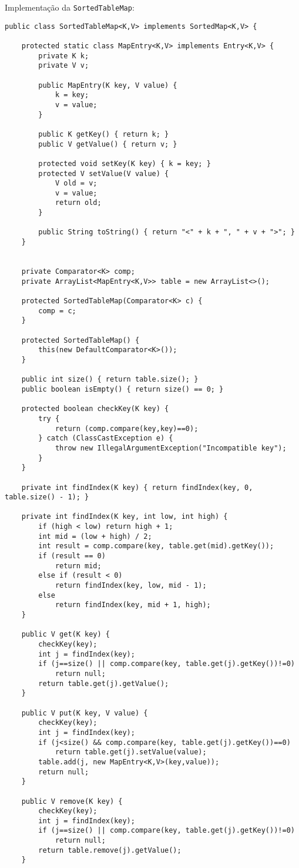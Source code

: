 Implementação da \texttt{SortedTableMap}:
\begin{verbatim}
public class SortedTableMap<K,V> implements SortedMap<K,V> {
	
	protected static class MapEntry<K,V> implements Entry<K,V> {
		private K k;
		private V v;
		
		public MapEntry(K key, V value) {
			k = key;
			v = value;
		}
		
		public K getKey() { return k; }
		public V getValue() { return v; }
		
		protected void setKey(K key) { k = key; }
		protected V setValue(V value) {
			V old = v;
			v = value;
			return old;
		}
		
		public String toString() { return "<" + k + ", " + v + ">"; }
	}
	
	
	private Comparator<K> comp;
	private ArrayList<MapEntry<K,V>> table = new ArrayList<>();
	
	protected SortedTableMap(Comparator<K> c) {
		comp = c;
	}
	
	protected SortedTableMap() {
		this(new DefaultComparator<K>());
	}
	
	public int size() { return table.size(); }
	public boolean isEmpty() { return size() == 0; }
	
	protected boolean checkKey(K key) {
		try {
			return (comp.compare(key,key)==0);
		} catch (ClassCastException e) {
			throw new IllegalArgumentException("Incompatible key");
		}
	}
	
	private int findIndex(K key) { return findIndex(key, 0, table.size() - 1); }
	
	private int findIndex(K key, int low, int high) {
		if (high < low) return high + 1;
		int mid = (low + high) / 2;
		int result = comp.compare(key, table.get(mid).getKey());
		if (result == 0)
			return mid;
		else if (result < 0)
			return findIndex(key, low, mid - 1);
		else
			return findIndex(key, mid + 1, high);
	}
	
	public V get(K key) {
		checkKey(key);
		int j = findIndex(key);
		if (j==size() || comp.compare(key, table.get(j).getKey())!=0)
			return null;
		return table.get(j).getValue();
	}
	
	public V put(K key, V value) {
		checkKey(key);
		int j = findIndex(key);
		if (j<size() && comp.compare(key, table.get(j).getKey())==0)
			return table.get(j).setValue(value);
		table.add(j, new MapEntry<K,V>(key,value));
		return null;
	}
	
	public V remove(K key) {
		checkKey(key);
		int j = findIndex(key);
		if (j==size() || comp.compare(key, table.get(j).getKey())!=0)
			return null;
		return table.remove(j).getValue();
	}
	

\end{verbatim}
